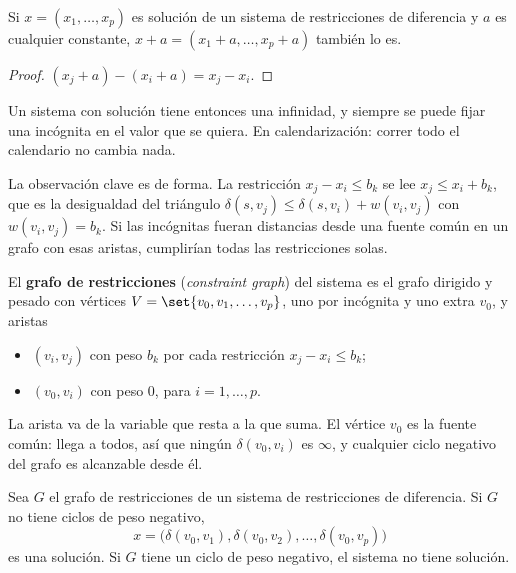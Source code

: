 \documentclass[11pt,letterpaper]{article}
\begin{document}
\begin{lema}
  \label{lem:traslacion-restricciones}
  Si $x = (x_1, \dots, x_p)$ es solución de un sistema de
  restricciones de diferencia y $a$ es cualquier constante,
  $x + a = (x_1 + a, \dots, x_p + a)$ también lo es.
\end{lema}

\begin{proof}
  $(x_j + a) - (x_i + a) = x_j - x_i$.
\end{proof}

Un sistema con solución tiene entonces una infinidad, y siempre se
puede fijar una incógnita en el valor que se quiera. En
calendarización: correr todo el calendario no cambia nada.

La observación clave es de forma. La restricción $x_j - x_i \le b_k$
se lee $x_j \le x_i + b_k$, que es la desigualdad del triángulo
$\delta(s, v_j) \le \delta(s, v_i) + w(v_i, v_j)$ con
$w(v_i, v_j) = b_k$. Si las incógnitas fueran distancias desde una
fuente común en un grafo con esas aristas, cumplirían todas las
restricciones solas.

\begin{definicion}
  \label{def:grafo-restricciones}
  El \textbf{grafo de restricciones} (\textit{constraint graph}) del
  sistema es el grafo dirigido y pesado con vértices
  $V = \set{v_0, v_1, \dots, v_p}$, uno por incógnita y uno extra
  $v_0$, y aristas
  \begin{itemize}[itemsep=0.1em]
    \item $(v_i, v_j)$ con peso $b_k$ por cada restricción
          $x_j - x_i \le b_k$;
    \item $(v_0, v_i)$ con peso $0$, para $i = 1, \dots, p$.
  \end{itemize}
\end{definicion}

La arista va de la variable que resta a la que suma. El vértice $v_0$
es la fuente común: llega a todos, así que ningún $\delta(v_0, v_i)$
es $\infty$, y cualquier ciclo negativo del grafo es alcanzable desde
él.

\begin{teorema}\label{teo:restricciones-solucion}
  Sea $G$ el grafo de restricciones de un sistema de restricciones de
  diferencia. Si $G$ no tiene ciclos de peso negativo,
  \[
    x = \bigl(\delta(v_0, v_1), \delta(v_0, v_2), \dots,
             \delta(v_0, v_p)\bigr)
  \]
  es una solución. Si $G$ tiene un ciclo de peso negativo, el sistema
  no tiene solución.
\end{teorema}
\end{document}
